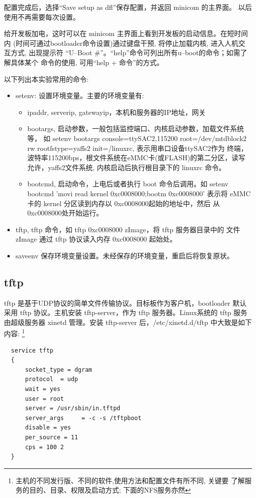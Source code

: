 	配置完成后，选择``Save setup as dfl''保存配置，并返回 minicom 的主界面。
以后使用不再需要每次设置。

	给开发板加电，这时可以在 minicom 主界面上看到开发板的启动信息。在短时间内
(时间可通过bootloader命令设置)通过键盘干预, 将停止加载内核, 进入人机交互方式,
出现提示符 ``U--Boot \#''。``help''命令可列出所有u--boot的命令；如需了解具体某个
命令的使用, 可用``help + 命令''的方式。

	以下列出本实验常用的命令:
\begin{itemize}
  \item setenv: 设置环境变量。主要的环境变量有:
  \begin{itemize}
    \item ipaddr, serverip, gatewayip，本机和服务器的IP地址，网关
    \item bootargs, 启动参数，一般包括监控端口、内核启动参数，加载文件系统等，
		如 setenv bootargs console=ttySAC2,115200 root=/dev/mtdblock2 rw
             rootfstype=yaffs2 init=/linuxrc, 表示用串口设备ttySAC2作为
		终端，波特率115200bps，根文件系统在eMMC卡(或FLASH)的第二分区，读写
		允许，yaffs2文件系统, 内核启动后执行根目录下的 linuxrc 命令。
	\item bootcmd, 启动命令，上电后或者执行 boot 命令后调用。如
		setenv bootcmd 'movi read kernel 0xc0008000;bootm 0xc0008000'
		表示将 eMMC 卡的 kernel 分区读到内存以 0xc0008000起始的地址中，然后
		从0xc0008000处开始运行。
  \end{itemize}
  \item tftp, tftp 命令，如 tftp 0xc0008000 zImage，将 tftp 服务器目录中的
        文件 zImage 通过 tftp 协议读入内存 0xc0008000 起始处。
  \item saveenv 保存环境变量设置。未经保存的环境变量，重启后将恢复原状。
\end{itemize}


\subsection{tftp}
    tftp 是基于UDP协议的简单文件传输协议。目标板作为客户机，bootloader 默认
采用 tftp 协议。主机安装 tftp-server，作为 tftp 服务器。Linux系统的 tftp
服务由超级服务器 xinetd 管理。安装 tftp-server 后，/etc/xinetd.d/tftp
中大致是如下内容:
\footnote{主机的不同发行版、不同的软件,使用方法和配置文件有所不同, 关键要
了解服务的目的、目录、权限及启动方式; 下面的NFS服务亦然}

\begin{verbatim}
  service tftp
  { 
      socket_type = dgram
      protocol  = udp
      wait = yes
      user = root
      server = /usr/sbin/in.tftpd
      server_args     = -c -s /tftpboot
      disable = yes
      per_source = 11
      cps = 100 2
  }
\end{verbatim}

